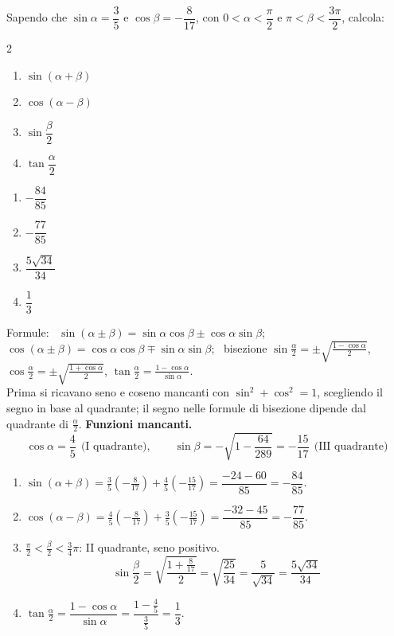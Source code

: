 
\begin{question}[ID=1.5, subtitle={Formule di addizione con $\sin\alpha=3/5$ e $\cos\beta=-8/17$}, tags={goniometria, formule di addizione}, difficulty=media]
Sapendo che $\sin \alpha = \dfrac{3}{5}$ e $\cos \beta = -\dfrac{8}{17}$, con $0 < \alpha < \dfrac{\pi}{2}$ e $\pi < \beta < \dfrac{3\pi}{2}$, calcola:
\begin{multicols}{2}
\begin{enumerate}
\item $\sin(\alpha + \beta)$
\item $\cos(\alpha - \beta)$
\item $\sin\dfrac{\beta}{2}$
\item $\tan\dfrac{\alpha}{2}$
\end{enumerate}
\end{multicols}
\begin{solution}
\begin{enumerate}
    \item $-\dfrac{84}{85}$
    \item $-\dfrac{77}{85}$
    \item $\dfrac{5\sqrt{34}}{34}$
    \item $\dfrac13$
\end{enumerate}
\end{solution}
\begin{explanation}
Formule: \ $\sin(\alpha\pm\beta)=\sin\alpha\cos\beta\pm\cos\alpha\sin\beta$; \ $\cos(\alpha\pm\beta)=\cos\alpha\cos\beta\mp\sin\alpha\sin\beta$; \ bisezione $\sin\tfrac\alpha2=\pm\sqrt{\tfrac{1-\cos\alpha}{2}}$, $\cos\tfrac\alpha2=\pm\sqrt{\tfrac{1+\cos\alpha}{2}}$, $\tan\tfrac\alpha2=\tfrac{1-\cos\alpha}{\sin\alpha}$. \\
Prima si ricavano seno e coseno mancanti con $\sin^2+\cos^2=1$, scegliendo il segno in base al quadrante; il segno nelle formule di bisezione dipende dal quadrante di $\tfrac\alpha2$.
\textbf{Funzioni mancanti.}
\[ \cos\alpha=\dfrac45 \ \ \text{(I quadrante)}, \qquad \sin\beta=-\sqrt{1-\dfrac{64}{289}}=-\dfrac{15}{17} \ \ \text{(III quadrante)} \]
\begin{enumerate}
    \item $\sin(\alpha+\beta)=\tfrac35\left(-\tfrac8{17}\right)+\tfrac45\left(-\tfrac{15}{17}\right)=\dfrac{-24-60}{85}=-\dfrac{84}{85}$.
    \item $\cos(\alpha-\beta)=\tfrac45\left(-\tfrac8{17}\right)+\tfrac35\left(-\tfrac{15}{17}\right)=\dfrac{-32-45}{85}=-\dfrac{77}{85}$.
    \item $\tfrac\pi2<\tfrac\beta2<\tfrac34\pi$: II quadrante, seno positivo.
    \[ \sin\dfrac\beta2=\sqrt{\dfrac{1+\frac8{17}}{2}}=\sqrt{\dfrac{25}{34}}=\dfrac{5}{\sqrt{34}}=\dfrac{5\sqrt{34}}{34} \]
    \item $\tan\tfrac\alpha2=\dfrac{1-\cos\alpha}{\sin\alpha}=\dfrac{1-\frac45}{\frac35}=\dfrac13$.
\end{enumerate}
\end{explanation}
\end{question}


